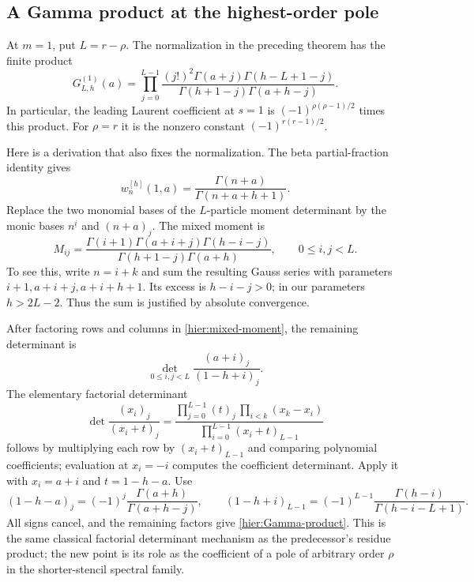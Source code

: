 \documentclass[11pt]{article}
\theoremstyle{definition}
\theoremstyle{remark}
\numberwithin{equation}{section}
\begin{document}
\subsection{A Gamma product at the highest-order pole}

At $m=1$, put $L=r-\rho$.  The normalization in the preceding theorem
has the finite product
\begin{equation}\label{hier:Gamma-product}
 \boxed{\displaystyle
 G_{L,h}^{(1)}(a)=
 \prod_{j=0}^{L-1}
 \frac{(j!)^2\Gamma(a+j)\Gamma(h-L+1-j)}
      {\Gamma(h+1-j)\Gamma(a+h-j)}.}
\end{equation}
In particular, the leading Laurent coefficient at $s=1$ is
$(-1)^{\rho(\rho-1)/2}$ times this product.  For $\rho=r$ it is
the nonzero constant $(-1)^{r(r-1)/2}$.

Here is a derivation that also fixes the normalization.  The beta
partial-fraction identity gives
\[
 w_n^{[h]}(1,a)=\frac{\Gamma(n+a)}{\Gamma(n+a+h+1)}.
\]
Replace the two monomial bases of the $L$-particle moment determinant
by the monic bases $n^{\underline i}$ and $(n+a)_j$.  The mixed
moment is
\begin{equation}\label{hier:mixed-moment}
 M_{ij}=\frac{\Gamma(i+1)\Gamma(a+i+j)\Gamma(h-i-j)}
                  {\Gamma(h+1-j)\Gamma(a+h)},
 \qquad 0\le i,j<L.
\end{equation}
To see this, write $n=i+k$ and sum the resulting Gauss series with
parameters $i+1,a+i+j,a+i+h+1$.  Its excess is $h-i-j>0$;
in our parameters $h>2L-2$.  Thus the sum is justified by absolute
convergence.

After factoring rows and columns in \eqref{hier:mixed-moment}, the
remaining determinant is
\[
 \det_{0\le i,j<L}\frac{(a+i)_j}{(1-h+i)_j}.
\]
The elementary factorial determinant
\[
 \det\frac{(x_i)_j}{(x_i+t)_j}
 =\frac{\prod_{j=0}^{L-1}(t)_j\,
             \prod_{i<k}(x_k-x_i)}
            {\prod_{i=0}^{L-1}(x_i+t)_{L-1}}
\]
follows by multiplying each row by $(x_i+t)_{L-1}$ and comparing
polynomial coefficients; evaluation at $x_i=-i$ computes the
coefficient determinant.  Apply it with $x_i=a+i$ and $t=1-h-a$.
Use
\[
 (1-h-a)_j=(-1)^j\frac{\Gamma(a+h)}{\Gamma(a+h-j)},\qquad
 (1-h+i)_{L-1}=(-1)^{L-1}
                    \frac{\Gamma(h-i)}{\Gamma(h-i-L+1)}.
\]
All signs cancel, and the remaining factors give
\eqref{hier:Gamma-product}.  This is the same classical factorial
determinant mechanism as the predecessor's residue product; the new
point is its role as the coefficient of a pole of arbitrary order
$\rho$ in the shorter-stencil spectral family.
\end{document}
